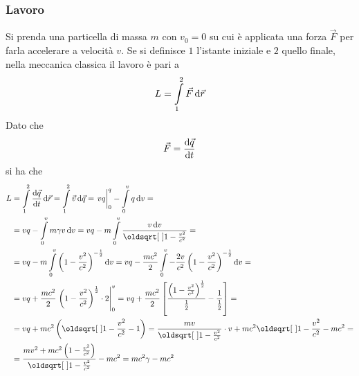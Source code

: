 \subsubsection{Lavoro}
Si prenda una particella di massa $m$ con $v_0=0$ su cui è applicata una forza $\vec{F}$ per farla
accelerare a velocità $v$. Se si definisce $1$ l'istante iniziale e $2$ quello finale, nella
meccanica classica il lavoro è pari a
\begin{equation*}
  L = \int\limits_{1}^{2} \vec{F}\mathop{}\!\mathrm{d}\vec{r}
\end{equation*}
Dato che
\begin{equation*}
  \vec{F} = \frac{\mathop{}\!\mathrm{d} \vec{q}}{\mathop{}\!\mathrm{d} t}
\end{equation*}
si ha che
\begin{align*}
  L &= \int\limits_{1}^{2} \der{\vec{q}}{t}\dif\vec{r}= \int\limits_{1}^{2} \vec{v}\dif\vec{q}=
  \left.\vphantom{\int}vq\right|_0^q-\int\limits_{0}^{v} q\dif v=\\
    &=vq-\int\limits_{0}^{v} m\gamma v\dif v=  
    vq-m \int\limits_{0}^{v} \frac{v\dif v}{\sqrt{1-\frac{v^2}{c^2}}}=\\
    &=vq-m \int\limits_{0}^{v} \left( 1-\frac{v^2}{c^2} \right)^{-\frac{1}{2}}\dif v=
    vq-\frac{mc^2}{2}
    \int\limits_{0}^{v} -\frac{2v}{c^2}\left( 1-\frac{v^2}{c^2} \right)^{-\frac{1}{2}}\dif v=\\
    &=vq+\frac{mc^2}{2}\left.\left( 1-\frac{v^2}{c^2}  \right)^{\frac{1}{2}}\cdot2\right|_0^v=
    vq+\frac{mc^2}{2} \left[ \frac{\left(1-\frac{v^2}{c^2}\right)^{\frac{1}{2}}}{\frac{1}{2}}-
    \frac{1}{\frac{1}{2}}\right]=\\
    &=vq+mc^2\left(\sqrt{1-\frac{v^2}{c^2}}-1\right)=\frac{mv}{\sqrt{1-\frac{v^2}{c^2}}}\cdot v+
    mc^2\sqrt{1-\frac{v^2}{c^2}}-mc^2=\\
    &=\frac{mv^2+mc^2\left( 1-\frac{v^2}{c^2} \right)}{\sqrt{1-\frac{v^2}{c^2}}}-mc^2=
    mc^2\gamma-mc^2
  \end{align*}
